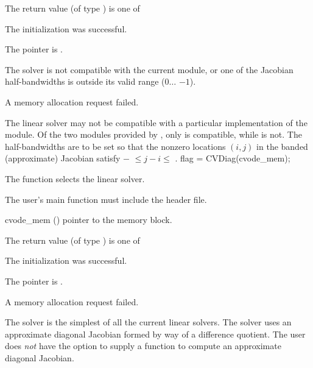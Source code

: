 {
  The return value  (of type ) is one of
  \begin{args}
  \item[\Id{SUCCESS}] 
    The {\cvband} initialization was successful.
  \item[\Id{LIN\_NO\_MEM}]
    The  pointer is .
  \item[\Id{LIN\_ILL\_INPUT}]
    The {\cvband} solver is not compatible with the current {\nvector} module, or
    one of the Jacobian half-bandwidths is outside its valid range ($0 \ldots$ $-1$).
  \item[\Id{LMEM\_FAIL}]
    A memory allocation request failed.
  \end{args}
}
{
  The {\cvband} linear solver may not be compatible with a particular
  implementation of the {\nvector} module. Of the two {\nvector} modules 
  provided by {\sundials}, only {\nvecs} is compatible, while {\nvecp} is not.
  The half-bandwidths are to be set so that the nonzero locations $(i,j)$ in the
  banded (approximate) Jacobian satisfy $-$ $\leq j-i \leq$ .
}
{
  flag = CVDiag(cvode\_mem);
}
{
  The function  selects the {\cvdiag} linear solver. 

  The user's main function must include the  header file.
}
{
  \begin{args}
  \item[cvode\_mem] ()
    pointer to the {\cvode} memory block.
  \end{args}
}
{
  The return value  (of type ) is one of
  \begin{args}
  \item[\Id{SUCCESS}]
    The {\cvdiag} initialization was successful.
  \item[\Id{LIN\_NO\_MEM}]
    The  pointer is .
  \item[\Id{LMEM\_FAIL}]
    A memory allocation request failed.
  \end{args}
}
{
  The {\cvdiag} solver is the simplest of all the current {\cvode} linear
  solvers. 
  The {\cvdiag} solver uses an approximate diagonal Jacobian formed by way of a difference 
  quotient. The user does {\em not} have the option to supply a function to compute
  an approximate diagonal Jacobian.
}
